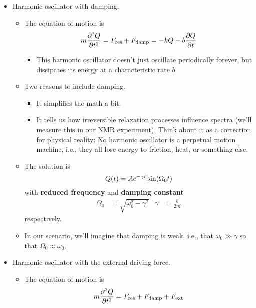 \documentclass[../notes.tex]{subfiles}
\begin{document}
\begin{itemize}
\begin{itemize}
    \end{itemize}
    \item Harmonic oscillator with damping.
    \begin{itemize}
        \item The equation of motion is
        \begin{equation*}
            m\pdv[2]{Q}{t} = F_\text{res}+F_\text{damp} = -kQ-b\pdv{Q}{t}
        \end{equation*}
        \begin{itemize}
            \item This harmonic oscillator doesn't just oscillate periodically forever, but dissipates its energy at a characteristic rate $b$.
        \end{itemize}
        \item Two reasons to include damping.
        \begin{itemize}
            \item It simplifies the math a bit.
            \item It tells us how irreversible relaxation processes influence spectra (we'll measure this in our NMR experiment). Think about it as a correction for physical reality: No harmonic oscillator is a perpetual motion machine, i.e., they all lose energy to friction, heat, or something else.
        \end{itemize}
        \item The solution is
        \begin{equation*}
            Q(t) = A\e[-\gamma t]\sin(\Omega_0t)
        \end{equation*}
        with \textbf{reduced frequency} and \textbf{damping constant}
        \begin{align*}
            \Omega_0 &= \sqrt{\omega_0^2-\gamma^2}&
            \gamma &= \frac{b}{2m}
        \end{align*}
        respectively.
        \item In our scenario, we'll imagine that damping is weak, i.e., that $\omega_0\gg\gamma$ so that $\Omega_0\approx\omega_0$.
    \end{itemize}
    \item Harmonic oscillator with the external driving force.
    \begin{itemize}
        \item The equation of motion is
        \begin{align*}
            m\pdv[2]{Q}{t} &= F_\text{res}+F_\text{damp}+F_\text{ext}\\

\end{align*}
\end{itemize}
\end{itemize}
\end{document}
